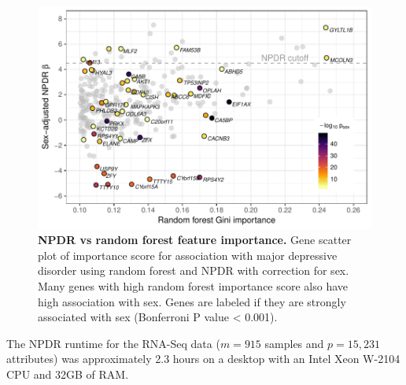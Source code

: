 \documentclass[10pt]{article}
\begin{document}
\begin{figure}[!tpb]%
\centerline{\includegraphics[]{../figs/mostafavi_npdr_rf_mdd.pdf}}
\caption{{\bf NPDR vs random forest feature importance.}
Gene scatter plot of importance score for association with major depressive disorder using random forest and NPDR with correction for sex. Many genes with high random forest importance score also have high association with sex. Genes are labeled if they are strongly associated with sex (Bonferroni P value < 0.001).}
\label{fig:mostafavi_npdr_rf_mdd}
\end{figure}
The NPDR runtime for the RNA-Seq data ($m=915$ samples and $p=15,231$ attributes) was approximately 2.3 hours on a desktop with an Intel Xeon W-2104 CPU and 32GB of RAM.

\end{document}
